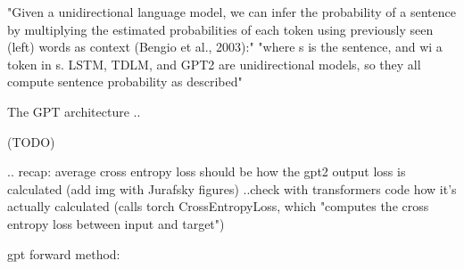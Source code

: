 "Given a unidirectional language model, we can
infer the probability of a sentence by multiplying
the estimated probabilities of each token using
previously seen (left) words as context (Bengio
et al., 2003):" \citep{lau2020furiously}
"where s is the sentence, and wi a token in s.
LSTM, TDLM, and GPT2 are unidirectional models,
so they all compute sentence probability as
described" \citep{lau2020furiously}

The GPT architecture \citep{radford2018improving} ..

(TODO)


..
recap: average cross entropy loss should be how the gpt2 output loss is calculated (add img with Jurafsky figures)
..check with transformers code how it's actually calculated
(calls torch CrossEntropyLoss, which "computes the cross entropy loss between input and target")


gpt forward method:

